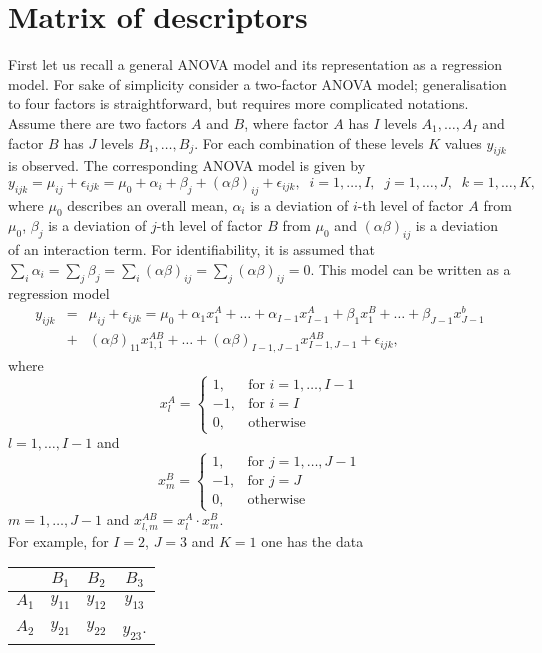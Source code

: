 \documentclass[12pt]{article}
\def\beqn{\begin{eqnarray*}}
\def\eeqn{\end{eqnarray*}}
\begin{document}
\section{Matrix of descriptors}
\label{subsec:covariates}
First let us recall a general ANOVA model and its representation as a regression model.
For sake of simplicity consider a two-factor ANOVA model; generalisation to four factors is straightforward, but requires more complicated notations. Assume there are two factors $A$ and $B$, where factor $A$ has $I$ levels $A_1,\ldots,A_I$ and factor $B$ has $J$ levels $B_1,\ldots,B_j$. For each combination of these levels $K$ values $y_{ijk}$ is observed. The corresponding ANOVA model is given by
$$
y_{ijk}=\mu_{ij}+\epsilon_{ijk}=\mu_0+\alpha_i+\beta_j+(\alpha\beta)_{ij}+\epsilon_{ijk},\;\;i=1,\ldots,I,\;\;j=1,\ldots,J,\;\;k=1,\ldots,K,
$$
where $\mu_0$ describes an overall mean, $\alpha_i$ is a deviation of $i$-th level of factor $A$ from $\mu_0$, $\beta_j$ is a deviation of $j$-th level of factor $B$ from $\mu_0$ and $(\alpha\beta)_{ij}$ is a deviation of an interaction term. For identifiability, it is assumed that $\sum_i\alpha_i=\sum_j\beta_j=\sum_{i}(\alpha\beta)_{ij}=\sum_{j}(\alpha\beta)_{ij}=0$. 
This model can be written as a regression model 
\beqn 
y_{ijk}&=&\mu_{ij}+\epsilon_{ijk}=\mu_0+\alpha_1 x_1^A+\ldots+\alpha_{I-1}x_{I-1}^A+\beta_1x_1^B+\ldots+\beta_{J-1}x_{J-1}^b\\
&+&(\alpha\beta)_{11}x_{1,1}^{AB}+\ldots+(\alpha\beta)_{I-1,J-1}x_{I-1,J-1}^{AB}+\epsilon_{ijk},
\eeqn
where
$$
x_l^A=\begin{cases}
	1,&\mbox{for }i=1,\ldots,I-1\\
	-1,&\mbox{for }i=I\\
	0,&\mbox{otherwise}
\end{cases}
$$
$l=1,\ldots,I-1$ and 
$$
x_m^B=\begin{cases}
	1,&\mbox{for }j=1,\ldots,J-1\\
	-1,&\mbox{for }j=J\\
	0,&\mbox{otherwise}
\end{cases}
$$
$m=1,\ldots,J-1$ and $x_{l,m}^{AB}=x_l^A\cdot x_m^B$.\\
For example, for $I=2$, $J=3$ and $K=1$ one has the data
\begin{center}
	\begin{tabular}{c|c|c|c}
		&$B_1$&$B_2$&$B_3$\\\hline
		$A_1$&$y_{11}$&$y_{12}$&$y_{13}$\\
		$A_2$&$y_{21}$&$y_{22}$&$y_{23}$.
	\end{tabular}
\end{center}
\end{document}
